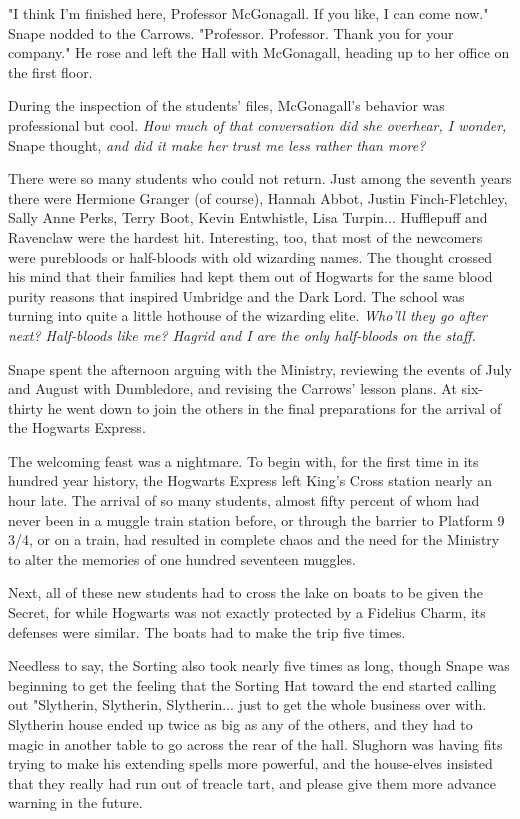 \documentclass[a4paper,11pt]{article}
\begin{document}
"I think I'm finished here, Professor McGonagall. If you like, I can come now." Snape nodded to the Carrows. "Professor. Professor. Thank you for your company." He rose and left the Hall with McGonagall, heading up to her office on the first floor.

During the inspection of the students' files, McGonagall's behavior was professional but cool. \emph{How much of that conversation did she overhear, I wonder,} Snape thought, \emph{and did it make her trust me less rather than more?}

There were so many students who could not return. Just among the seventh years there were Hermione Granger (of course), Hannah Abbot, Justin Finch-Fletchley, Sally Anne Perks, Terry Boot, Kevin Entwhistle, Lisa Turpin... Hufflepuff and Ravenclaw were the hardest hit. Interesting, too, that most of the newcomers were purebloods or half-bloods with old wizarding names. The thought crossed his mind that their families had kept them out of Hogwarts for the same blood purity reasons that inspired Umbridge and the Dark Lord. The school was turning into quite a little hothouse of the wizarding elite. \emph{Who'll they go after next? Half-bloods like me? Hagrid and I are the only half-bloods on the staff.}

Snape spent the afternoon arguing with the Ministry, reviewing the events of July and August with Dumbledore, and revising the Carrows' lesson plans. At six-thirty he went down to join the others in the final preparations for the arrival of the Hogwarts Express.

The welcoming feast was a nightmare. To begin with, for the first time in its hundred year history, the Hogwarts Express left King's Cross station nearly an hour late. The arrival of so many students, almost fifty percent of whom had never been in a muggle train station before, or through the barrier to Platform 9 3/4, or on a train, had resulted in complete chaos and the need for the Ministry to alter the memories of one hundred seventeen muggles.

Next, all of these new students had to cross the lake on boats to be given the Secret, for while Hogwarts was not exactly protected by a Fidelius Charm, its defenses were similar. The boats had to make the trip five times.

Needless to say, the Sorting also took nearly five times as long, though Snape was beginning to get the feeling that the Sorting Hat toward the end started calling out "Slytherin, Slytherin, Slytherin... just to get the whole business over with. Slytherin house ended up twice as big as any of the others, and they had to magic in another table to go across the rear of the hall. Slughorn was having fits trying to make his extending spells more powerful, and the house-elves insisted that they really had run out of treacle tart, and please give them more advance warning in the future.
\end{document}
